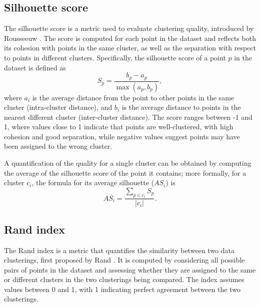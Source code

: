 \subsection{Silhouette score}
The silhouette score is a metric used to evaluate clustering quality, introduced by Rousseeuw \cite{Rousseeuw1987}. The score is computed for each point in the dataset and reflects both its cohesion with points in the same cluster, as well as the separation with respect to points in different clusters. Specifically, the silhouette score of a point $p$ in the dataset is defined as 
\begin{equation}
  \label{eqn:silhouette}
  S_{p} = \frac{b_{p} - a_{p}}{\max({a_{p}, b_{p}})},
\end{equation}
where $a_{i}$ is the average distance from the point to other points in the same cluster (intra-cluster distance), and $b_{i}$ is the average distance to points in the nearest different cluster (inter-cluster distance). The score ranges between -1 and 1, where values close to 1 indicate that points are well-clustered, with high cohesion and good separation, while negative values suggest points may have been assigned to the wrong cluster. 

A quantification of the quality for a single cluster can be obtained by computing the average of the silhouette score of the point it contains; more formally, for a cluster $c_{i}$, the formula for its average silhouette ($AS_{i}$) is 
\begin{equation}
  \label{eqn:cluster_silhouette}
  AS_{i} = \frac{\sum_{p \in c_{i}} S_{p}}{|c_{i}|}.
\end{equation}

\subsection{Rand index}
The Rand index is a metric that quantifies the similarity between two data clusterings, first proposed by Rand \cite{Rand1971}. It is computed by considering all possible pairs of points in the dataset and assessing whether they are assigned to the same or different clusters in the two clusterings being compared. The index assumes values between 0 and 1, with 1 indicating perfect agreement between the two clusterings. 

